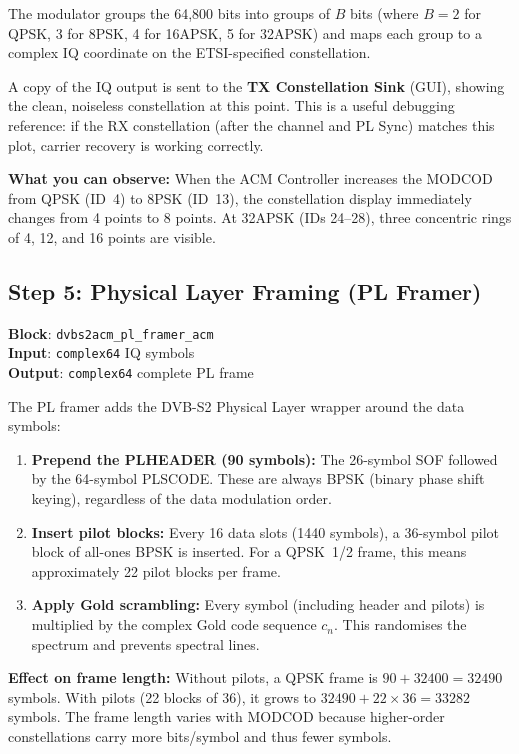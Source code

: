 \documentclass[12pt,a4paper]{report}
\begin{document}
The modulator groups the 64,800 bits into groups of $B$ bits (where $B = 2$
for QPSK, 3 for 8PSK, 4 for 16APSK, 5 for 32APSK) and maps each group to a
complex IQ coordinate on the ETSI-specified constellation.

A copy of the IQ output is sent to the \textbf{TX Constellation Sink} (GUI),
showing the clean, noiseless constellation at this point. This is a useful
debugging reference: if the RX constellation (after the channel and PL Sync)
matches this plot, carrier recovery is working correctly.

\textbf{What you can observe:} When the ACM Controller increases the MODCOD
from QPSK (ID~4) to 8PSK (ID~13), the constellation display immediately changes
from 4 points to 8 points. At 32APSK (IDs 24--28), three concentric rings of
4, 12, and 16 points are visible.

\subsection{Step 5: Physical Layer Framing (PL Framer)}

\textbf{Block}: \texttt{dvbs2acm\_pl\_framer\_acm} \\
\textbf{Input}: \texttt{complex64} IQ symbols \\
\textbf{Output}: \texttt{complex64} complete PL frame

The PL framer adds the DVB-S2 Physical Layer wrapper around the data symbols:

\begin{enumerate}
    \item \textbf{Prepend the PLHEADER (90 symbols):} The 26-symbol SOF
          followed by the 64-symbol PLSCODE. These are always BPSK (binary
          phase shift keying), regardless of the data modulation order.
    \item \textbf{Insert pilot blocks:} Every 16 data slots (1440 symbols),
          a 36-symbol pilot block of all-ones BPSK is inserted. For a QPSK~1/2
          frame, this means approximately 22 pilot blocks per frame.
    \item \textbf{Apply Gold scrambling:} Every symbol (including header and
          pilots) is multiplied by the complex Gold code sequence $c_n$.
          This randomises the spectrum and prevents spectral lines.
\end{enumerate}

\textbf{Effect on frame length:} Without pilots, a QPSK frame is
$90 + 32400 = 32490$ symbols. With pilots (22 blocks of 36), it grows to
$32490 + 22 \times 36 = 33282$ symbols. The frame length varies with MODCOD
because higher-order constellations carry more bits/symbol and thus fewer
symbols.
\end{document}
